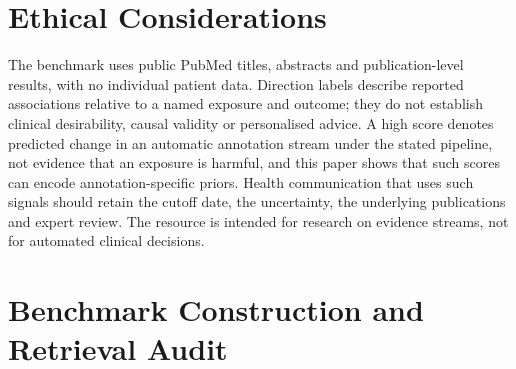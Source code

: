 \documentclass[11pt]{article}
\begin{document}
\section*{Ethical Considerations}
The benchmark uses public PubMed titles, abstracts and publication-level results, with no individual
patient data. Direction labels describe reported associations relative to a named exposure and
outcome; they do not establish clinical desirability, causal validity or personalised advice. A
high score denotes predicted change in an automatic annotation stream under the stated pipeline,
not evidence that an exposure is harmful, and this paper shows that such scores can encode
annotation-specific priors. Health communication that uses such signals should retain the cutoff
date, the uncertainty, the underlying publications and expert review. The resource is intended for
research on evidence streams, not for automated clinical decisions.



\appendix
\renewcommand{\thesection}{\AlphAlph{\value{section}}}

\section{Benchmark Construction and Retrieval Audit}
\label{app:bench}
\end{document}

